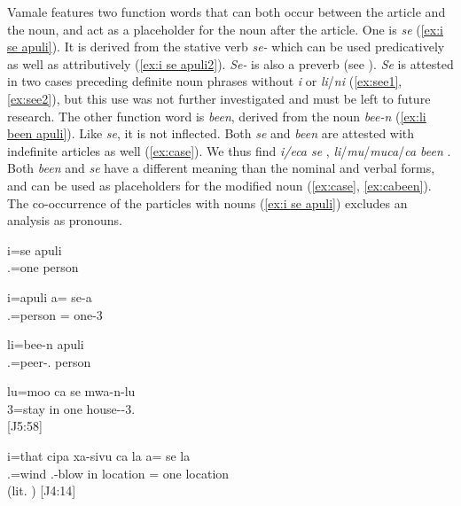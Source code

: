 Vamale features two function words that can both occur between the article and the noun, and act as a placeholder for the noun after the article. One is \textit{se}  (\ref{ex:i se apuli}). It is derived from the stative verb \textit{se-}  which can be used predicatively as well as attributively (\ref{ex:i se apuli2}). \textit{Se-} is also a preverb (see ). \textit{Se} is attested in two cases preceding definite noun phrases without \textit{i} or \textit{li}/\textit{ni} (\ref{ex:see1}, \ref{ex:see2}), but this use was not further investigated and must be left to future research. The other function word is \textit{been}, derived from the noun \textit{bee-n}  (\ref{ex:li been apuli}). Like \textit{se}, it is not inflected. Both \textit{se} and \textit{been} are attested with indefinite articles as well (\ref{ex:case}). We thus find \textit{i/eca se} , \textit{li}\slash\textit{mu}\slash\textit{muca}\slash\textit{ca been} . Both \textit{been} and \textit{se} have a different meaning than the nominal and verbal forms, and can be used as placeholders for the modified noun (\ref{ex:case}, \ref{ex:cabeen}). The co-occurrence of the particles with nouns (\ref{ex:i se apuli}) excludes an analysis as pronouns. 


\ea\label{ex:i se apuli}
\gll i=se apuli\\
 .=one person\\
\glt {}
\z


\ea\label{ex:i se apuli2}
\gll i=apuli a= se-a\\
 .=person = one-3\\
\glt {}
\z


\ea\label{ex:li been apuli}
\gll li=bee-n apuli\\
 .=peer-. person\\
\glt {}
\z


\ea\label{ex:see1}
\gll lu=moo ca se mwa-n-lu\\
 3=stay in one house--3.\\
\glt {} {[J5:58]}
\z


\ea\label{ex:see2}
\gll i=that cipa xa-sivu ca la a= se la\\
 .=wind  .-blow in location = one location\\
\glt {} (lit. ) {[J4:14]}
\z 


